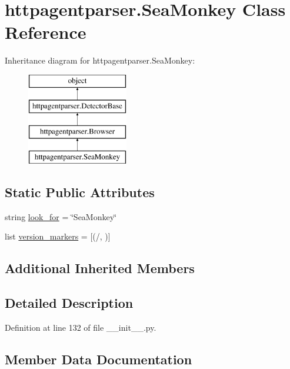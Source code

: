 \hypertarget{classhttpagentparser_1_1_sea_monkey}{}\section{httpagentparser.\+Sea\+Monkey Class Reference}
\label{classhttpagentparser_1_1_sea_monkey}
Inheritance diagram for httpagentparser.\+Sea\+Monkey\+:\begin{figure}[H]
\begin{center}
\leavevmode
\includegraphics[height=4.000000cm]{classhttpagentparser_1_1_sea_monkey}
\end{center}
\end{figure}
\subsection*{Static Public Attributes}
\begin{DoxyCompactItemize}
\item 
string \hyperlink{classhttpagentparser_1_1_sea_monkey_a268a28a8be17c9326de7d345d21c0995}{look\+\_\+for} = \char`\"{}Sea\+Monkey\char`\"{}
\item 
list \hyperlink{classhttpagentparser_1_1_sea_monkey_ab0ddb8c4b36c97342c57f662b457d14d}{version\+\_\+markers} = \mbox{[}(\textquotesingle{}/\textquotesingle{}, \textquotesingle{}\textquotesingle{})\mbox{]}
\end{DoxyCompactItemize}
\subsection*{Additional Inherited Members}


\subsection{Detailed Description}


Definition at line 132 of file \+\_\+\+\_\+init\+\_\+\+\_\+.\+py.



\subsection{Member Data Documentation}
\hypertarget{classhttpagentparser_1_1_sea_monkey_a268a28a8be17c9326de7d345d21c0995}{}\label{classhttpagentparser_1_1_sea_monkey_a268a28a8be17c9326de7d345d21c0995} 
